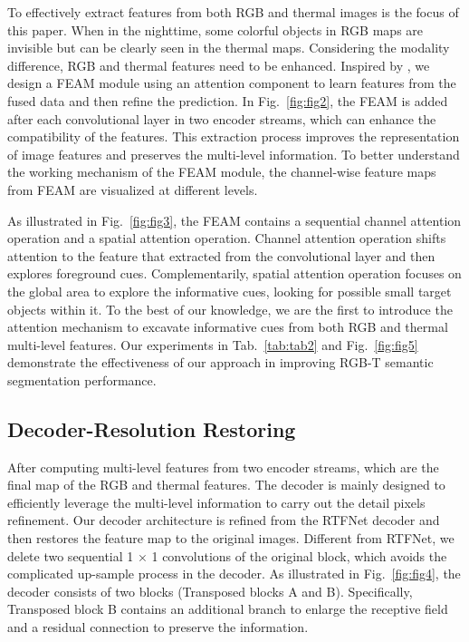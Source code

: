 \documentclass[letterpaper, 10 pt, conference]{ieeeconf}  \usepackage{graphicx}
\begin{document}
To effectively extract features from both RGB and thermal images is the focus of this paper. When in the nighttime, some colorful objects in RGB maps are invisible but can be clearly seen in the thermal maps. Considering the modality difference, RGB and thermal features need to be enhanced. Inspired by \cite{woo2018cbam}, we design a FEAM module using an attention component to learn features from the fused data and then refine the prediction. In Fig.~\ref{fig:fig2}, the FEAM is added after each convolutional layer in two encoder streams, which can enhance the compatibility of the features. This extraction process improves the representation of image features and preserves the multi-level information. To better understand the working mechanism of the FEAM module, the channel-wise feature maps from FEAM are visualized at different levels.

As illustrated in Fig.~\ref{fig:fig3}, the FEAM contains a sequential channel attention operation and a spatial attention operation. Channel attention operation shifts attention to the feature that extracted from the convolutional layer and then explores foreground cues. Complementarily, spatial attention operation focuses on the global area to explore the informative cues, looking for possible small target objects within it. To the best of our knowledge, we are the first to introduce the attention mechanism to excavate informative cues from both RGB and thermal multi-level features. Our experiments in Tab.~\ref{tab:tab2} and Fig.~\ref{fig:fig5} demonstrate the effectiveness of our approach in improving RGB-T semantic segmentation performance.

\subsection{Decoder-Resolution Restoring}

After computing multi-level features from two encoder streams, which are the final map of the RGB and thermal features. The decoder is mainly designed to efficiently leverage the multi-level information to carry out the detail pixels refinement. Our decoder architecture is refined from the RTFNet decoder and then restores the feature map to the original images. Different from RTFNet, we delete two sequential 1 × 1 convolutions of the original block, which avoids the complicated up-sample process in the decoder. As illustrated in Fig.~\ref{fig:fig4}, the decoder consists of two blocks (Transposed blocks A and B). Specifically, Transposed block B contains an additional branch to enlarge the receptive field and a residual connection to preserve the information. 
\end{document}
